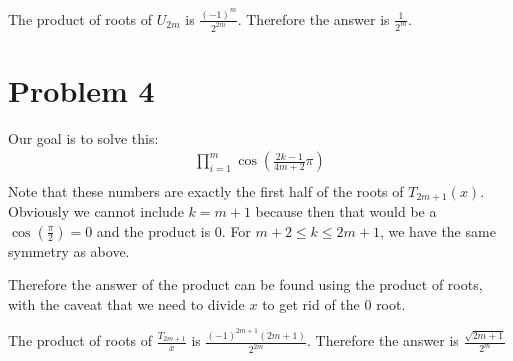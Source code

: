 \documentclass{article}
\begin{document}
The product of roots of $ U_{2m} $ is $ \frac{(-1)^m}{2^{2m}} $. Therefore the answer is $ \frac{1}{2^m} $.

\section{Problem 4}
Our goal is to solve this:
\begin{eqnarray*}
  \prod_{i=1}^{m}{\cos\left(\frac{2k - 1}{4m + 2}\pi\right)} \\
\end{eqnarray*}
Note that these numbers are exactly the first half of the roots of $ T_{2m+1}(x) $. Obviously we cannot include $ k = m + 1 $ because then that would be a $ \cos\left(\frac{\pi}{2}\right) = 0 $ and the product is 0. For $ m + 2 \le k \le 2m + 1 $, we have the same symmetry as above.

Therefore the answer of the product can be found using the product of roots, with the caveat that we need to divide $ x $ to get rid of the 0 root.

The product of roots of $ \frac{T_{2m+1}}{x} $ is $ \frac{(-1)^{2m+1} (2m+1)}{2^{2m}} $. Therefore the answer is $ \frac{\sqrt{2m+1}}{2^m} $
\end{document}
